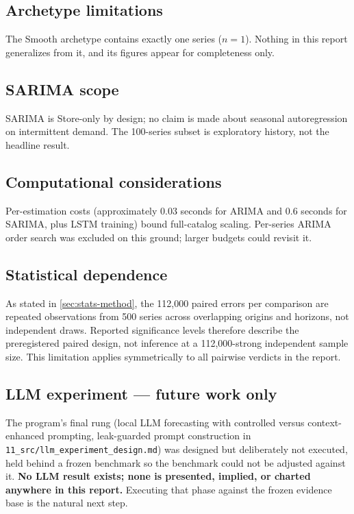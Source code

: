 \subsection{Archetype limitations}
\label{sec:smooth-cap}
The Smooth archetype contains exactly one series ($n=1$). Nothing in this
report generalizes from it, and its figures appear for completeness only.

\subsection{SARIMA scope}
\label{sec:l-sarima}
SARIMA is Store-only by design; no claim is made about seasonal
autoregression on intermittent demand. The 100-series subset is exploratory
history, not the headline result.

\subsection{Computational considerations}
\label{sec:l-compute}
Per-estimation costs (approximately 0.03 seconds for ARIMA and 0.6 seconds
for SARIMA, plus LSTM training) bound full-catalog scaling. Per-series ARIMA
order search was excluded on this ground; larger budgets could revisit it.

\subsection{Statistical dependence}
\label{sec:l-dependence}
As stated in \cref{sec:stats-method}, the 112,000 paired errors per
comparison are repeated observations from 500 series across overlapping
origins and horizons, not independent draws. Reported significance levels
therefore describe the preregistered paired design, not inference at a
112,000-strong independent sample size. This limitation applies symmetrically
to all pairwise verdicts in the report.

\subsection{LLM experiment --- future work only}
\label{sec:llm-future}
The program's final rung (local LLM forecasting with controlled versus
context-enhanced prompting, leak-guarded prompt construction in
\texttt{11\_src/llm\_experiment\_design.md}) was designed but deliberately
not executed, held behind a frozen benchmark so the benchmark could not be
adjusted against it. \textbf{No LLM result exists; none is presented,
implied, or charted anywhere in this report.} Executing that phase against
the frozen evidence base is the natural next step.

